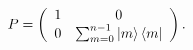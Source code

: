 \begin{equation}
P=\left(
\begin{array}
[c]{cc}%
1 & 0\\
0 & \sum_{m=0}^{n-1}\left\vert m\right\rangle \left\langle m\right\vert
\end{array}
\right) . \label{P2}%
\end{equation}

